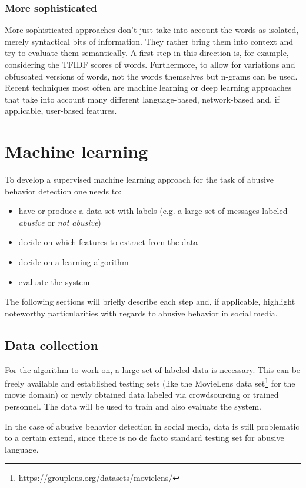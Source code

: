 \documentclass{proseminar}
\begin{document}
\subsubsection{More sophisticated} More sophisticated approaches don't just take into account the words as isolated, merely syntactical bits of information. They rather bring them into context and try to evaluate them semantically. A first step in this direction is, for example, considering the TFIDF scores of words. Furthermore, to allow for variations and obfuscated versions of words, not the words themselves but n-grams can be used\cite{Yin:2009}. Recent techniques most often are machine learning\cite{Yahoo:2016}\cite{Twitter:2017} or deep learning\cite{DeepLearning:2017} approaches that take into account many different language-based, network-based and, if applicable, user-based features.

\section{Machine learning}
To develop a supervised machine learning approach for the task of abusive behavior detection one needs to:
\begin{itemize}
\item have or produce a data set with labels (e.g. a large set of messages labeled \emph{abusive} or \emph{not abusive})
\item decide on which features to extract from the data
\item decide on a learning algorithm
\item evaluate the system
\end{itemize}
The following sections will briefly describe each step and, if applicable, highlight noteworthy particularities with regards to abusive behavior in social media.

\subsection{Data collection}
For the algorithm to work on, a large set of labeled data is necessary. This can be freely available and established testing sets (like the MovieLens data set\footnote{\url{https://grouplens.org/datasets/movielens/}} for the movie domain) or newly obtained data labeled via crowdsourcing or trained personnel. The data will be used to train and also evaluate the system.

In the case of abusive behavior detection in social media, data is still problematic to a certain extend, since there is no de facto standard testing set for abusive language\cite{Yahoo:2016}.
\end{document}
